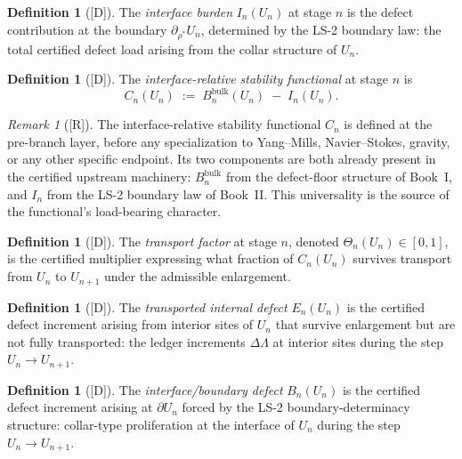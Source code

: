 \documentclass[12pt,oneside]{amsbook}
\theoremstyle{plain}
\theoremstyle{definition}
\newtheorem{definition}[theorem]{Definition}
\theoremstyle{remark}
\newtheorem{remark}[theorem]{Remark}
\newcommand{\status}[1]{\textup{[#1]}}
\begin{document}
\begin{definition}[\status{D}]\label{def:interface-burden}
The \emph{interface burden} $I_n(U_n)$ at stage $n$ is the defect
contribution at the boundary $\partial_{\rho^*} U_n$, determined by
the LS-2 boundary law: the total certified defect load arising from
the collar structure of $U_n$.
\end{definition}

\begin{definition}[\status{D}]\label{def:stability-functional}
The \emph{interface-relative stability functional} at stage $n$ is
\[
  C_n(U_n) \;:=\; B_n^{\mathrm{bulk}}(U_n) \;-\; I_n(U_n).
\]
\end{definition}

\begin{remark}[\status{R}]\label{rmk:functional-universality}
The interface-relative stability functional $C_n$ is defined at the
pre-branch layer, before any specialization to Yang--Mills, Navier--Stokes,
gravity, or any other specific endpoint.  Its two components are both
already present in the certified upstream machinery: $B_n^{\mathrm{bulk}}$
from the defect-floor structure of Book~I, and $I_n$ from the LS-2
boundary law of Book~II.  This universality is the source of the
functional's load-bearing character.
\end{remark}

\begin{definition}[\status{D}]\label{def:transport-factor}
The \emph{transport factor} at stage $n$, denoted $\Theta_n(U_n) \in
[0, 1]$, is the certified multiplier expressing what fraction of
$C_n(U_n)$ survives transport from $U_n$ to $U_{n+1}$ under the
admissible enlargement.
\end{definition}

\begin{definition}[\status{D}]\label{def:internal-defect}
The \emph{transported internal defect} $E_n(U_n)$ is the certified
defect increment arising from interior sites of $U_n$ that survive
enlargement but are not fully transported: the ledger increments
$\Delta\Lambda$ at interior sites during the step $U_n \to U_{n+1}$.
\end{definition}

\begin{definition}[\status{D}]\label{def:boundary-defect}
The \emph{interface/boundary defect} $B_n(U_n)$ is the certified
defect increment arising at $\partial U_n$ forced by the LS-2
boundary-determinacy structure: collar-type proliferation at the
interface of $U_n$ during the step $U_n \to U_{n+1}$.
\end{definition}
\end{document}
